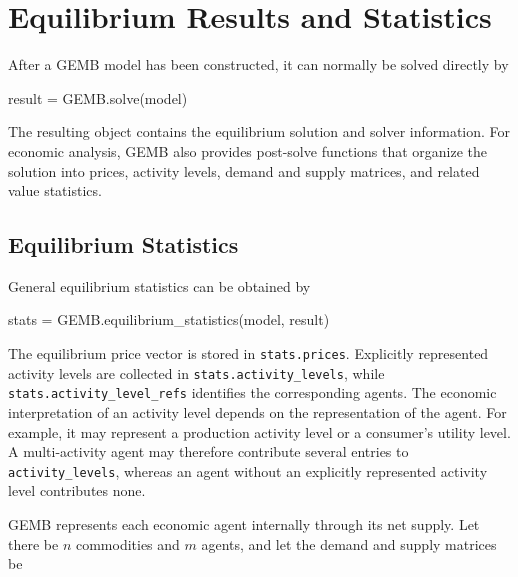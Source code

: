 \documentclass[
  letterpaper,
  DIV=11,
  numbers=noendperiod]{scrreprt}
\newenvironment{Shaded}{\begin{snugshade}}{\end{snugshade}}
\newcommand{\FunctionTok}[1]{\textcolor[rgb]{0.28,0.35,0.67}{#1}}
\newcommand{\NormalTok}[1]{\textcolor[rgb]{0.00,0.23,0.31}{#1}}
\newcommand{\OperatorTok}[1]{\textcolor[rgb]{0.37,0.37,0.37}{#1}}
\begin{document}
\section{Equilibrium Results and
Statistics}\label{equilibrium-results-and-statistics}

After a GEMB model has been constructed, it can normally be solved
directly by

\begin{Shaded}
\begin{Highlighting}[]
\NormalTok{result }\OperatorTok{=}\NormalTok{ GEMB.}\FunctionTok{solve}\NormalTok{(model)}
\end{Highlighting}
\end{Shaded}

The resulting object contains the equilibrium solution and solver
information. For economic analysis, GEMB also provides post-solve
functions that organize the solution into prices, activity levels,
demand and supply matrices, and related value statistics.

\subsection{Equilibrium Statistics}\label{equilibrium-statistics}

General equilibrium statistics can be obtained by

\begin{Shaded}
\begin{Highlighting}[]
\NormalTok{stats }\OperatorTok{=}\NormalTok{ GEMB.}\FunctionTok{equilibrium\_statistics}\NormalTok{(model, result)}
\end{Highlighting}
\end{Shaded}

The equilibrium price vector is stored in \texttt{stats.prices}.
Explicitly represented activity levels are collected in
\texttt{stats.activity\_levels}, while
\texttt{stats.activity\_level\_refs} identifies the corresponding
agents. The economic interpretation of an activity level depends on the
representation of the agent. For example, it may represent a production
activity level or a consumer's utility level. A multi-activity agent may
therefore contribute several entries to \texttt{activity\_levels},
whereas an agent without an explicitly represented activity level
contributes none.

GEMB represents each economic agent internally through its net supply.
Let there be \(n\) commodities and \(m\) agents, and let the demand and
supply matrices be
\end{document}
